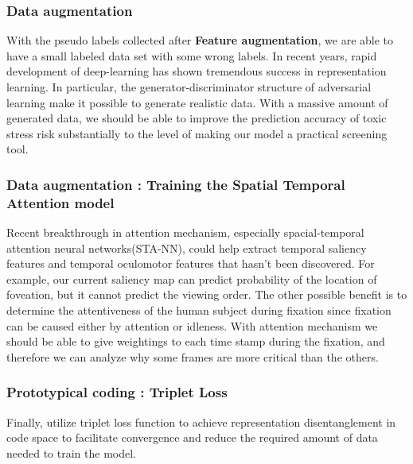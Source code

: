 \documentclass[a4paper, times, 12pt, ,onecolumn,oneside,top=1.0cm,bottom=1.0cm,left=1.0 cm,right=1cm]{article}
\begin{document}
\subsubsection{Data augmentation} With the pseudo labels collected after \textbf{Feature augmentation}, we are able to have a small labeled data set with some wrong labels. In recent years, rapid development of deep-learning has shown tremendous success in representation learning. In particular, the generator-discriminator structure of adversarial learning make it possible to generate realistic data. With a massive amount of generated data, we should be able to improve the prediction accuracy of toxic stress risk substantially to the level of making our model a practical screening tool. 

\subsubsection{Data augmentation : Training the Spatial Temporal Attention model}
Recent breakthrough in attention mechanism, especially spacial-temporal attention neural networks(STA-NN), could help extract temporal saliency features and temporal oculomotor features that hasn't been discovered. For example, our current saliency map can predict probability of the location of foveation, but it cannot predict the viewing order. The other possible benefit is to determine the attentiveness of the human subject during fixation since fixation can be caused either by attention or idleness. With attention mechanism we should be able to give weightings to each time stamp during the fixation, and therefore we can analyze why some frames are more critical than the others. 

\subsubsection{ Prototypical coding : Triplet Loss}
Finally, utilize triplet loss function to achieve representation disentanglement in code space to facilitate convergence and reduce the required amount of data needed to train the model.
\end{document}
